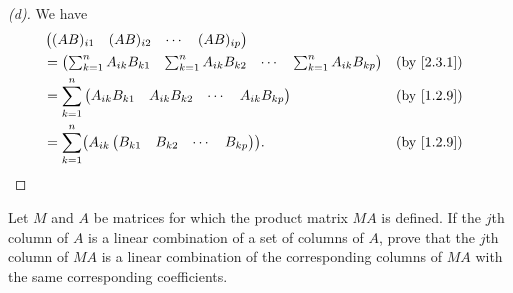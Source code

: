 \begin{proof}[(d)]
	We have
	\begin{align*}
		 & \begin{pmatrix}
			   (AB)_{i 1} & (AB)_{i 2} & \cdots & (AB)_{i p}
		   \end{pmatrix}                                                                              \\
		 & = \begin{pmatrix}
			     \sum_{k = 1}^n A_{i k} B_{k 1} & \sum_{k = 1}^n A_{i k} B_{k 2} & \cdots & \sum_{k = 1}^n A_{i k} B_{k p}
		     \end{pmatrix} &  & \by{2.3.1}                \\
		 & = \sum_{k = 1}^n \begin{pmatrix}
			                    A_{i k} B_{k 1} & A_{i k} B_{k 2} & \cdots & A_{i k} B_{k p}
		                    \end{pmatrix}                                              &  & \by{1.2.9}                                \\
		 & = \sum_{k = 1}^n \pa{A_{i k} \begin{pmatrix}
				                                B_{k 1} & B_{k 2} & \cdots & B_{k p}
			                                \end{pmatrix}}.                                                               &  & \by{1.2.9}
	\end{align*}
\end{proof}

\begin{ex}\label{ex:2.3.15}
	Let \(M\) and \(A\) be matrices for which the product matrix \(MA\) is defined.
	If the \(j\)th column of \(A\) is a linear combination of a set of columns of \(A\), prove that the \(j\)th column of \(MA\) is a linear combination of the corresponding columns of \(MA\) with the same corresponding coefficients.
\end{ex}

